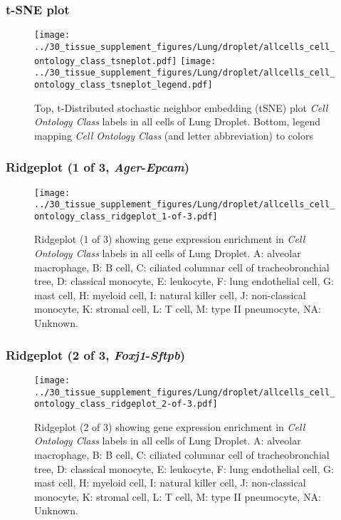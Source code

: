 \clearpage
\subsubsection{t-SNE plot}
\begin{figure}[h]
\centering
\texttt{[image: ../30\_tissue\_supplement\_figures/Lung/droplet/allcells\_cell\_ontology\_class\_tsneplot.pdf]}
\texttt{[image: ../30\_tissue\_supplement\_figures/Lung/droplet/allcells\_cell\_ontology\_class\_tsneplot\_legend.pdf]}
\caption{Top, t-Distributed stochastic neighbor embedding (tSNE) plot  \emph{Cell Ontology Class} labels in all cells of Lung Droplet. Bottom, legend mapping \emph{Cell Ontology Class} (and letter abbreviation) to colors}
\end{figure}


\clearpage

\subsubsection{Ridgeplot (1 of 3, \emph{Ager}-\emph{Epcam})}
\begin{figure}[h]
\centering
\texttt{[image: ../30\_tissue\_supplement\_figures/Lung/droplet/allcells\_cell\_ontology\_class\_ridgeplot\_1-of-3.pdf]}

\caption{ Ridgeplot (1 of 3)  showing gene expression enrichment in \emph{Cell Ontology Class} labels in all cells of Lung Droplet. A: alveolar macrophage, B: B cell, C: ciliated columnar cell of tracheobronchial tree, D: classical monocyte, E: leukocyte, F: lung endothelial cell, G: mast cell, H: myeloid cell, I: natural killer cell, J: non-classical monocyte, K: stromal cell, L: T cell, M: type II pneumocyte, NA: Unknown.}
\end{figure}


\clearpage

\subsubsection{Ridgeplot (2 of 3, \emph{Foxj1}-\emph{Sftpb})}
\begin{figure}[h]
\centering
\texttt{[image: ../30\_tissue\_supplement\_figures/Lung/droplet/allcells\_cell\_ontology\_class\_ridgeplot\_2-of-3.pdf]}

\caption{ Ridgeplot (2 of 3)  showing gene expression enrichment in \emph{Cell Ontology Class} labels in all cells of Lung Droplet. A: alveolar macrophage, B: B cell, C: ciliated columnar cell of tracheobronchial tree, D: classical monocyte, E: leukocyte, F: lung endothelial cell, G: mast cell, H: myeloid cell, I: natural killer cell, J: non-classical monocyte, K: stromal cell, L: T cell, M: type II pneumocyte, NA: Unknown.}
\end{figure}


